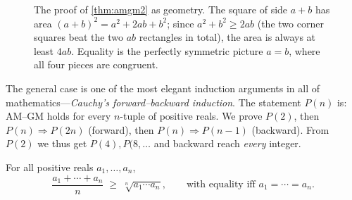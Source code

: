 \begin{figure}[ht]
  \centering
  \caption{The proof of \cref{thm:amgm2} as geometry. The square of
  side $a+b$ has area $(a+b)^2 = a^2 + 2ab + b^2$; since $a^2 + b^2
  \ge 2ab$ (the two corner squares beat the two $ab$ rectangles in
  total), the area is always at least $4ab$. Equality is the perfectly
  symmetric picture $a = b$, where all four pieces are congruent.}
  \label{fig:amgm-square}
\end{figure}

The general case is one of the most elegant induction arguments in
all of mathematics---\emph{Cauchy's forward--backward induction}. The
statement $P(n)$ is: AM--GM holds for every $n$-tuple of positive
reals. We prove $P(2)$, then $P(n) \Rightarrow P(2n)$ (forward), then
$P(n) \Rightarrow P(n-1)$ (backward). From $P(2)$ we thus get $P(4),
P(8, \dots$ and backward reach \emph{every} integer.

\begin{theorem}[AM--GM, general]\label{thm:amgm}
For all positive reals $a_1, \dots, a_n$,
\[
  \frac{a_1 + \cdots + a_n}{n} \;\ge\; \sqrt[n]{a_1 \cdots a_n},
  \qquad\text{with equality iff } a_1 = \cdots = a_n.
\]
\end{theorem}

